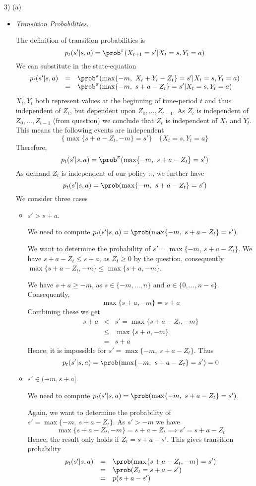 \documentclass[11pt,a4paper]{article}
\begin{document}
\begin{answer}{3) (a)}
\begin{itemize}
    \item \textit{Transition Probabilities}.
    \par The definition of transition probabilities is
    \[ p_t(s'|s,a)=\prob^\pi(X_{t+1}=s'|X_t=s,Y_t=a) \]
    We can substitute in the state-equation
    \[\begin{array}{rcl}
      p_t(s'|s,a)&=&\prob^\pi(\max\{-m,\ X_t+Y_t-Z_t\}=s'|X_t=s,Y_t=a)\\
      &=&\prob^\pi(\max\{-m,\ s+a-Z_t\}=s'|X_t=s,Y_t=a)
    \end{array}\]
    $X_t,Y_t$ both represent values at the beginning of time-period $t$ and thus independent of $Z_t$, but dependent upon $Z_0,\dots,Z_{t-1}$. As $Z_t$ is independent of $Z_0,\dots,Z_{t-1}$ (from question) we conclude that $Z_t$ is independent of $X_t$ and $Y_t$. This means the following events are independent
    \[ \big\{\max\{s+a-Z_t,-m\}=s'\big\}\quad\big\{X_t=s,Y_t=a\big\} \]
    Therefore,
    \[ p_t(s'|s,a)=\prob^\pi(\max\{-m,\ s+a-Z_t\}=s') \]
    As demand $Z_t$ is independent of our policy $\pi$, we further have
    \[ p_t(s'|s,a)=\prob(\max\{-m,\ s+a-Z_t\}=s') \]
    We consider three cases
    \begin{itemize}
      \item $s'>s+a$.
      \par We need to compute $p_t(s'|s,a)=\prob(\max\{-m,\ s+a-Z_t\}=s')$.
      \par We want to determine the probability of $s'=\max\{-m,\ s+a-Z_t\}$. We have $s+a-Z_t\leq s+a$, as $Z_t\geq0$ by the question, consequently $\max\{s+a-Z_t,-m\}\leq\max\{s+a,-m\}$.
      \par We have $s+a\geq-m$, as $s\in\{-m,\dots,n\}$ and $a\in\{0,\dots,n-s\}$. Consequently,
      \[ \max\{s+a,-m\}=s+a \]
      Combining these we get
      \[\begin{array}{rcl}
        s+a&<&s'=\max\{s+a-Z_t,-m\}\\
        &\leq&\max\{s+a,-m\}\\
        &=&s+a
      \end{array}\]
      Hence, it is impossible for $s'=\max\{-m,\ s+a-Z_t\}$. Thus
      \[ p_t(s'|s,a)=\prob(\max\{-m,\ s+a-Z_t\}=s')=0 \]

      \item $s'\in(-m,s+a]$.
      \par We need to compute $p_t(s'|s,a)=\prob(\max\{-m,\ s+a-Z_t\}=s')$.
      \par Again, we want to determine the probability of $s'=\max\{-m,\ s+a-Z_t\}$. As $s'>-m$ we have
      \[ \max\{s+a-Z_t,-m\}=s+a-Z_t \implies s'=s+a-Z_t \]
      Hence, the result only holds if $Z_t=s+a-s'$. This gives transition probability
      \[\begin{array}{rcl}
        p_t(s'|s,a)&=&\prob(\max\{s+a-Z_t,-m\}=s')\\
        &=&\prob(Z_t=s+a-s')\\
        &=&p(s+a-s')
      \end{array}\]


\end{itemize}
\end{itemize}
\end{answer}
\end{document}
